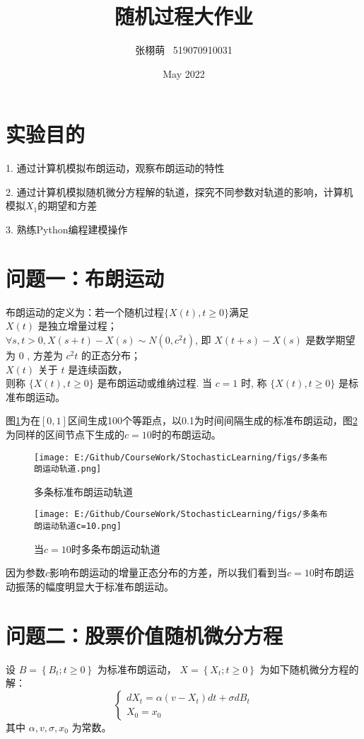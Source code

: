 \documentclass{article}
\title{随机过程大作业}
\author{张栩萌 \ 519070910031}
\date{May 2022}
\begin{document}
\maketitle

\section{实验目的}
1. 通过计算机模拟布朗运动，观察布朗运动的特性

2. 通过计算机模拟随机微分方程解的轨道，探究不同参数对轨道的影响，计算机模拟$X_1$的期望和方差

3. 熟练Python编程建模操作




\section{问题一：布朗运动}
布朗运动的定义为：若一个随机过程$\{X(t), t \ge 0\}$满足\\
$X(t)$ 是独立增量过程；\\
$\forall s, t>0, X(s+t)-X(s) \sim N\left(0, c^{2} t\right)$, 即 $X(t+s)-X(s)$ 是数学期望 为 0 , 方差为 $c^{2} t$ 的正态分布；\\
$X(t)$ 关于 $t$ 是连续函数，\\
则称 $\{X(t), t \ge 0\}$ 是布朗运动或维纳过程. 当 $c=1$ 时, 称 $\{X(t), t \ge 0\}$ 是标准布朗运动。

图\ref{fig:brown1}为在$[0, 1]$区间生成100个等距点，以0.1为时间间隔生成的标准布朗运动，图\ref{fig:brown1_10}为同样的区间节点下生成的$c=10$时的布朗运动。

\begin{figure}[H]
    \centering
    \texttt{[image: E:/Github/CourseWork/StochasticLearning/figs/多条布朗运动轨道.png]}
    \caption{多条标准布朗运动轨道}
    \label{fig:brown1}
    \end{figure}

\begin{figure}[H]
    \centering
    \texttt{[image: E:/Github/CourseWork/StochasticLearning/figs/多条布朗运动轨道c=10.png]}
    \caption{当$c=10$时多条布朗运动轨道}
    \label{fig:brown1_10}
    \end{figure}

因为参数$c$影响布朗运动的增量正态分布的方差，所以我们看到当$c=10$时布朗运动振荡的幅度明显大于标准布朗运动。




\section{问题二：股票价值随机微分方程}
设 $B=\left\{B_{t} ; t \geq 0\right\}$ 为标准布朗运动， $X=\left\{X_{t} ; t \geq 0\right\}$ 为如下随机微分方程的解：
$$
\left\{\begin{array}{l}
d X_{t}=\alpha\left(v-X_{t}\right) d t+\sigma d B_{t} \\
X_{0}=x_{0}
\end{array}\right.
$$
其中 $\alpha, v, \sigma, x_{0}$ 为常数。
\end{document}
